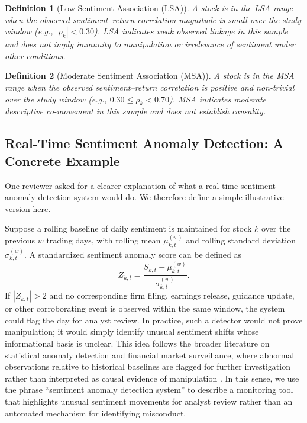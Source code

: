 \documentclass[lettersize,journal]{IEEEtran}
\newtheorem{definition}{Definition}
\begin{document}
\begin{definition}[Low Sentiment Association (LSA)]
A stock is in the LSA range when the observed sentiment--return correlation magnitude is small over the study window (e.g., $|\rho_k| < 0.30$). LSA indicates weak observed linkage in this sample and does not imply immunity to manipulation or irrelevance of sentiment under other conditions.
\end{definition}

\begin{definition}[Moderate Sentiment Association (MSA)]
A stock is in the MSA range when the observed sentiment--return correlation is positive and non-trivial over the study window (e.g., $0.30 \le \rho_k < 0.70$). MSA indicates moderate descriptive co-movement in this sample and does not establish causality.
\end{definition}

\subsection{Real-Time Sentiment Anomaly Detection: A Concrete Example}
One reviewer asked for a clearer explanation of what a real-time sentiment anomaly detection system would do. We therefore define a simple illustrative version here.

Suppose a rolling baseline of daily sentiment is maintained for stock $k$ over the previous $w$ trading days, with rolling mean $\mu_{k,t}^{(w)}$ and rolling standard deviation $\sigma_{k,t}^{(w)}$. A standardized sentiment anomaly score can be defined as
\begin{equation}
Z_{k,t} = \frac{S_{k,t} - \mu_{k,t}^{(w)}}{\sigma_{k,t}^{(w)}}.
\end{equation}
If $|Z_{k,t}| > 2$ and no corresponding firm filing, earnings release, guidance update, or other corroborating event is observed within the same window, the system could flag the day for analyst review. In practice, such a detector would not prove manipulation; it would simply identify unusual sentiment shifts whose informational basis is unclear. This idea follows the broader literature on statistical anomaly detection and financial market surveillance, where abnormal observations relative to historical baselines are flagged for further investigation rather than interpreted as causal evidence of manipulation \cite{howell2021statistical, chandola2009anomaly}. In this sense, we use the phrase ``sentiment anomaly detection system'' to describe a monitoring tool that highlights unusual sentiment movements for analyst review rather than an automated mechanism for identifying misconduct.
\end{document}
